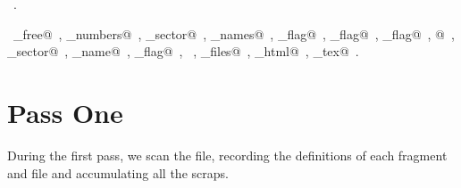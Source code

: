 \documentclass[a4paper]{report}
\begin{document}
\begin{flushleft}
\begin{minipage}{\linewidth}
\begin{list}{}{\setlength{\itemsep}{-\parsep}\setlength{\itemindent}{-\leftmargin}}
\item \NWtxtMacroRefIn\ .
\item \NWtxtIdentsUsed\nobreak\  \verb@arena_free@\nobreak\ , \verb@collect_numbers@\nobreak\ , \verb@current_sector@\nobreak\ , \verb@file_names@\nobreak\ , \verb@html_flag@\nobreak\ , \verb@number_flag@\nobreak\ , \verb@output_flag@\nobreak\ , @\nobreak\ , \verb@prev_sector@\nobreak\ , \verb@source_name@\nobreak\ , \verb@tex_flag@\nobreak\ , \verb@TRUE@\nobreak\ , \verb@write_files@\nobreak\ , \verb@write_html@\nobreak\ , \verb@write_tex@\nobreak\ .
\item{}
\end{list}
\end{minipage}\vspace{4ex}
\end{flushleft}
\newpage
\section{Pass One} \label{pass-one}

During the first pass, we scan the file, recording the definitions of
each fragment and file and accumulating all the scraps.
\end{document}
